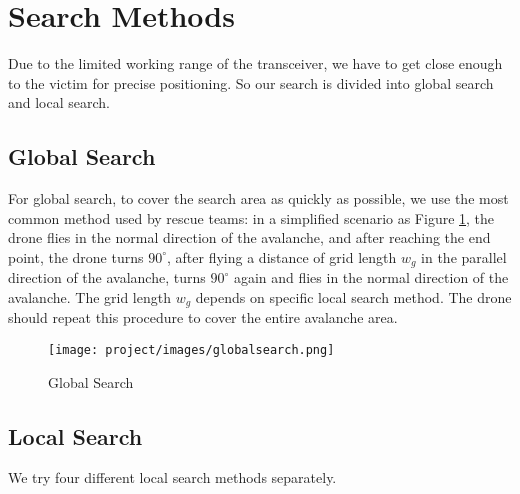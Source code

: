\documentclass[conference]{IEEEtran}
\begin{document}

\section{Search Methods}\label{section:Search Methods}
Due to the limited working range of the transceiver, we have to get close enough to the victim for precise positioning. So our search is divided into global search and local search.

\subsection{Global Search}
For global search, to cover the search area as quickly as possible, we use the most common method used by rescue teams: in a simplified scenario as Figure \ref{fig:global}, the drone flies in the normal direction of the avalanche, and after reaching the end point, the drone turns $90^{\circ}$, after flying a distance of grid length $w_{g}$ in the parallel direction of the avalanche, turns $90^{\circ}$ again and flies in the normal direction of the avalanche. The grid length $w_{g}$ depends on specific local search method. The drone should repeat this procedure to cover the entire avalanche area.

\begin{figure}[h!]
    \centering
    \texttt{[image: project/images/globalsearch.png]}
    \caption{Global Search}
    \label{fig:global}
\end{figure}

\subsection{Local Search}
We try four different local search methods separately.
\end{document}
